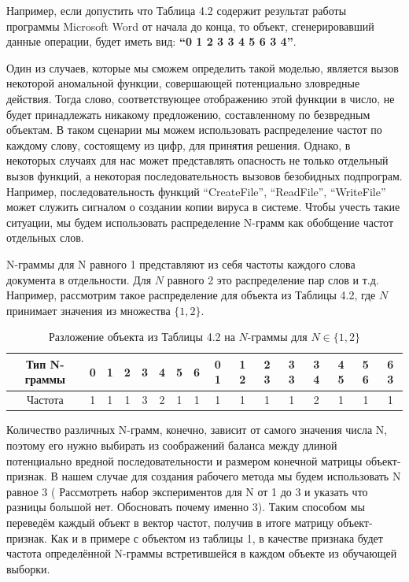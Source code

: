 Например, если допустить что Таблица 4.2 содержит результат работы программы Microsoft Word от начала до конца, то объект, сгенерировавший данные операции, будет иметь вид: \textbf{“0 1 2 3 3 4 5 6 3 4”}.

Один из случаев, которые мы сможем определить такой моделью, является вызов некоторой аномальной функции, совершающей потенциально зловредные действия. Тогда слово, соответствующее отображению этой функции в число, не будет принадлежать никакому предложению, составленному по безвредным объектам. В таком сценарии мы можем использовать распределение частот по каждому слову, состоящему из цифр, для принятия решения. Однако, в некоторых случаях для нас может представлять опасность не только отдельный вызов функций, а некоторая последовательность вызовов безобидных подпрограм. Например, последовательность функций “CreateFile”, “ReadFile”, “WriteFile” может служить сигналом о создании копии вируса в системе. Чтобы учесть такие ситуации, мы будем использовать распределение N-грамм как обобщение частот отдельных слов. 

N-граммы для N равного 1 представляют из себя частоты каждого слова документа в отдельности. Для $N$ равного 2 это распределение пар слов и т.д. Например, рассмотрим такое распределение для объекта из Таблицы 4.2, где $N$ принимает значения из множества $\{1,2\}$.

\bgroup
\def\arraystretch{1.5}%
\begin{table}[ht]
\caption{Разложение объекта из Таблицы 4.2 на $N$-граммы для $N \in \{1, 2\}$}
\label{tab_weight}
\centering
    \begin{tabular}{|c|c|c|c|c|c|c|c|c|c|c|c|c|c|c|c|}
    \hline \rowcolor{lightgray!50} Тип N-граммы & 0 & 1 & 2 & 3 & 4 & 5 & 6 & 0 1 & 1 2 & 2 3 & 3 3 & 3 4 & 4 5 & 5 6 & 6 3 \\
    \hline Частота & 1 & 1 & 1 & 3 & 2 & 1 & 1 & 1 & 1 & 1 & 1 & 2 & 1 & 1 & 1 \\
    \hline
    \end{tabular}
\end{table}
\egroup

Количество различных N-грамм, конечно, зависит от самого значения числа N, поэтому его нужно выбирать из соображений баланса между длиной потенциально вредной последовательности и размером конечной матрицы объект-признак. В нашем случае для создания рабочего метода мы будем использовать N равное 3 ( Рассмотреть набор экспериментов для N от 1 до 3 и указать что разницы большой нет. Обосновать почему именно 3). Таким способом мы переведём каждый объект в вектор частот, получив в итоге матрицу объект-признак. Как и в примере с объектом из таблицы 1, в качестве признака будет частота определённой N-граммы встретившейся в каждом объекте из обучающей выборки.

